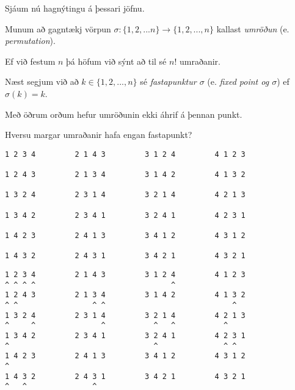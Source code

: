 {
	{
		\item<1-> Sjáum nú hagnýtingu á þessari jöfnu.
		\item<2-> Munum að gagntækj vörpun $\sigma \colon \{1, 2, ... n\} \rightarrow \{1, 2, ..., n\}$ kallast \emph{umröðun} (e. \emph{permutation}).
		\item<3-> Ef við festum $n$ þá höfum við sýnt að til sé $n!$ umraðanir.
		\item<4-> Næst segjum við að $k \in \{1, 2, ..., n\}$ sé \emph{fastapunktur $\sigma$} (e. \emph{fixed point og $\sigma$}) ef $\sigma(k) = k$.
		\item<5-> Með öðrum orðum hefur umröðunin ekki áhrif á þennan punkt.
		\item<6-> Hversu margar umraðanir hafa engan fastapunkt?
	}
}

{ \begin{verbatim}
1 2 3 4         2 1 4 3         3 1 2 4         4 1 2 3

1 2 4 3         2 1 3 4         3 1 4 2         4 1 3 2

1 3 2 4         2 3 1 4         3 2 1 4         4 2 1 3

1 3 4 2         2 3 4 1         3 2 4 1         4 2 3 1

1 4 2 3         2 4 1 3         3 4 1 2         4 3 1 2

1 4 3 2         2 4 3 1         3 4 2 1         4 3 2 1

\end{verbatim}}
{ \begin{verbatim}
1 2 3 4         2 1 4 3         3 1 2 4         4 1 2 3
^ ^ ^ ^                               ^                
1 2 4 3         2 1 3 4         3 1 4 2         4 1 3 2
^ ^                 ^ ^                             ^  
1 3 2 4         2 3 1 4         3 2 1 4         4 2 1 3
^     ^               ^           ^   ^           ^    
1 3 4 2         2 3 4 1         3 2 4 1         4 2 3 1
^                                 ^               ^ ^  
1 4 2 3         2 4 1 3         3 4 1 2         4 3 1 2
^                                                      
1 4 3 2         2 4 3 1         3 4 2 1         4 3 2 1
^   ^               ^                                  
\end{verbatim}}
